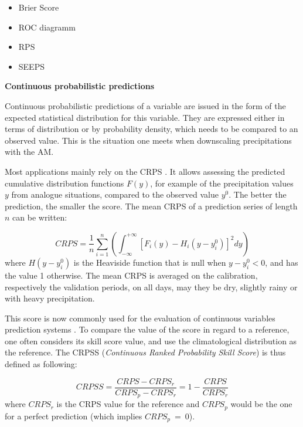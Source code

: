 \documentclass[review]{elsarticle}
\begin{document}
\begin{itemize}
	\setlength\itemsep{-1mm}
	\item Brier Score \citep{Brier1950}
	\item ROC diagramm \citep[Relative Operating Characteristic or Receiver Operating Characteristic,][]{Mason1982}
	\item RPS \citep[Ranked Probability Score,][]{Epstein1969}
	\item SEEPS \citep[Stable Equitable Error in Probability Space,][]{Rodwell2010,Rodwell2011}
\end{itemize}


\textbf{Continuous probabilistic predictions}
\label{sec:prob_forecasts}

Continuous probabilistic predictions of a variable are issued in the form of the expected statistical distribution for this variable. They are expressed either in terms of distribution or by probability density, which needs to be compared to an observed value. This is the situation one meets when downscaling precipitations with the AM.

Most applications mainly rely on the CRPS \citep[Continuous Ranked Probability Score,][]{Brown1974, Matheson1976, Hersbach2000}. It allows assessing the predicted cumulative distribution functions $F(y)$, for example of the precipitation values $y$ from analogue situations, compared to the observed value $y^{0}$. The better the prediction, the smaller the score. The mean CRPS of a prediction series of length $n$ can be written:

\begin{equation}
\label{eq:CRPS}
CRPS = \frac{1}{n} \sum_{i=1}^{n} \left(  \int_{-\infty}^{+\infty} \left[ F_{i}(y)-H_{i}(y-y_{i}^{0})\right]^{2} dy \right) 
\end{equation}
where $H(y-y_{i}^{0})$ is the Heaviside function that is null when $y-y_{i}^{0}<0$, and has the value 1 otherwise. The mean CRPS is averaged on the calibration, respectively the validation periods, on all days, may they be dry, slightly rainy or with heavy precipitation.

This score is now commonly used for the evaluation of continuous variables prediction systems \citep{Casati2008, Marty2010}. To compare the value of the score in regard to a reference, one often considers its skill score value, and use the climatological distribution as the reference. The CRPSS (\textit{Continuous Ranked Probability Skill Score}) is thus defined as following:

\begin{equation}
\label{eq:CRPSS}
CRPSS = \frac{CRPS-CRPS_{r}}{CRPS_{p}-CRPS_{r}} = 1-\frac{CRPS}{CRPS_{r}}
\end{equation}
where $CRPS_{r}$ is the CRPS value for the reference and $CRPS_{p}$ would be the one for a perfect prediction (which implies $CRPS_{p}~=~0$).
\end{document}
